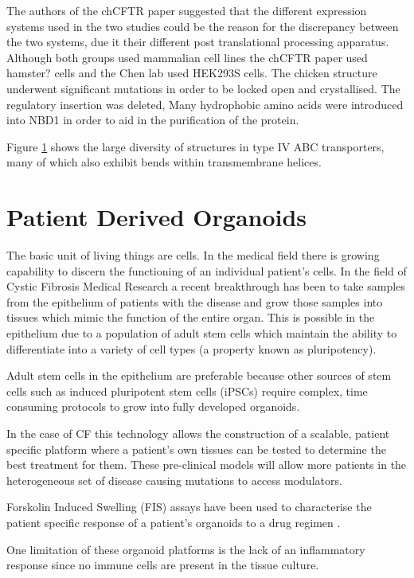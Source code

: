 The authors of the chCFTR paper suggested that the different expression systems used in the two studies could be the reason for the discrepancy between the two systems, due it their different post translational processing apparatus. Although both groups used mammalian cell lines the chCFTR paper used hamster? cells \cite{aleksandrov2015} and the Chen lab used HEK293S cells. The chicken structure underwent significant mutations in order to be locked open and crystallised. The regulatory insertion was deleted, Many hydrophobic amino acids were introduced into NBD1 in order to aid in the purification of the protein. 

Figure \ref{} shows the large diversity of structures in type IV ABC transporters, many of which also exhibit bends within transmembrane helices\cite{thomas2020}. 

\section{Patient Derived Organoids}
The basic unit of living things are cells. In the medical field there is growing capability to discern the functioning of an individual patient's cells. In the field of Cystic Fibrosis Medical Research a recent breakthrough has been to take samples from the epithelium of patients with the disease and grow those samples into tissues which mimic the function of the entire organ\cite{depoel2020}. This is possible in the epithelium due to a population of adult stem cells which maintain the ability to differentiate into a variety of cell types (a property known as pluripotency). 

Adult stem cells in the epithelium are preferable because other sources of stem cells such as induced pluripotent stem cells (iPSCs) require complex, time consuming protocols to grow into fully developed organoids. 

In the case of CF this technology allows the construction of a scalable, patient specific platform where a patient's own tissues can be tested to determine the best treatment for them. These pre-clinical models will allow more patients in the heterogeneous set of disease causing mutations to access modulators. 

Forskolin Induced Swelling (FIS) assays have been used to characterise the patient specific response of a patient's organoids to a drug regimen \cite{dekkers2013}. 


One limitation of these organoid platforms is the lack of an inflammatory response since no immune cells are present in the tissue culture. 


%
